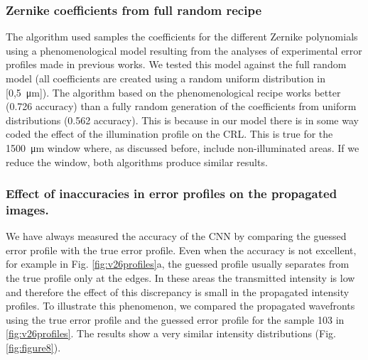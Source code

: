 \documentclass[preprint]{iucr}
\begin{document}
\subsubsection{Zernike coefficients from full random recipe}
The algorithm used samples the coefficients for the different Zernike polynomials using a phenomenological model resulting from the analyses of experimental error profiles made in previous works. We tested this model against the full random model (all  coefficients are created using a random uniform distribution in [0,\SI{5}{\micro\meter}]). The algorithm based on the phenomenological recipe works better (0.726 accuracy) than a fully random generation of the coefficients from uniform distributions (0.562 accuracy). This is because in our model there is in some way coded the effect of the illumination profile on the CRL. This is true for the \SI{1500}{\micro\meter} window where, as discussed before, include non-illuminated areas. If we reduce the window, both algorithms produce similar results. 

\subsubsection{Effect of inaccuracies in error profiles on the propagated images.}
We have always measured the accuracy of the CNN by comparing the guessed error profile with the true error profile. Even when the accuracy is not excellent, for example in Fig. \ref{fig:v26profiles}a, the guessed profile usually separates from the true profile only at the edges. In these areas the transmitted intensity is low and therefore the effect of this discrepancy is small in the propagated intensity profiles. To illustrate this phenomenon, we compared the propagated wavefronts using the true error profile and the guessed error profile for the sample 103 in \ref{fig:v26profiles}. The results show a very similar intensity distributions (Fig. \ref{fig:figure8}).
\end{document}
